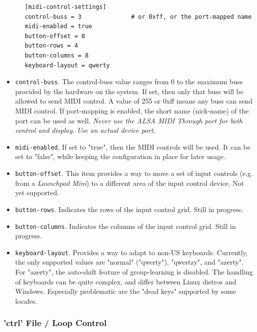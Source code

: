    \begin{verbatim}
      [midi-control-settings]
      control-buss = 3              # or 0xff, or the port-mapped name
      midi-enabled = true
      button-offset = 0
      button-rows = 4
      button-columns = 8
      keyboard-layout = qwerty
   \end{verbatim}

   \begin{itemize}
      \item \texttt{control-buss}.
         The control-buss value ranges from 0 to the maximum buss provided by
         the hardware on the system. If set, then only that buss will be allowed
         to send MIDI control.  A value of 255 or 0xff means any buss can send
         MIDI control. If port-mapping is enabled, the short name (nick-name) of
         the port can be used as well.
         \textsl{Never use the ALSA MIDI Through port for both control
         and display. Use an actual device port.}
      \item \texttt{midi-enabled}.
         If set to "true", then the MIDI controls will be used.
         It can be set to "false", while keeping the configuration in place
         for later usage.
      \item \texttt{button-offset}.
         This item provides a way to move a set of input controls (e.g. from a
         \textsl{Launchpad Mini}) to a different area of the input control
         device.  Not yet supported.
      \item \texttt{button-rows}.
         Indicates the rows of the input control grid.
         Still in progress.
      \item \texttt{button-columns}.
         Indicates the columns of the input control grid.
         Still in progress.
      \item \texttt{keyboard-layout}.
         Provides a way to adapt to non-US keyboards.
         Currently, the only supported values are "normal" ("qwerty"), "qwertzy",
         and "azerty".
         For "azerty", the auto-shift feature of group-learning is disabled.
         The handling of keyboards can be quite complex, and differ between
         Linux distros and Windows.
         Especially problematic are the "dead keys" supported by some locales.
   \end{itemize}

\subsubsection{'ctrl' File / Loop Control}
\label{subsubsec:configuration_ctrl_loop_control}

